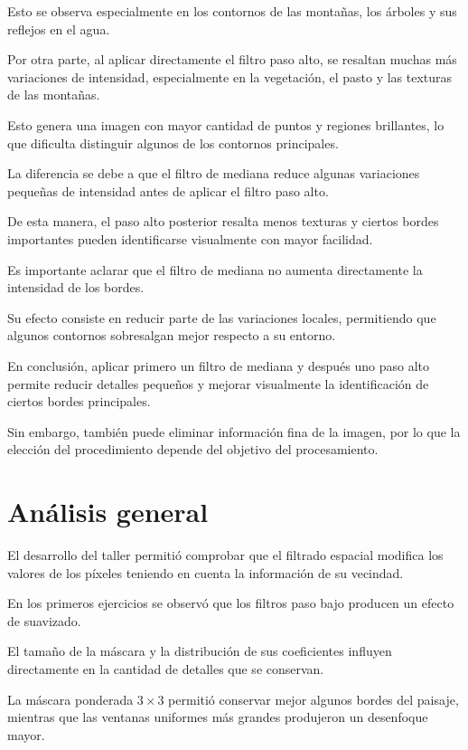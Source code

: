 \documentclass[11pt,letterpaper]{article}
\begin{document}
Esto se observa especialmente
en los contornos de las montañas,
los árboles y sus reflejos en el agua.

Por otra parte, al aplicar directamente
el filtro paso alto, se resaltan
muchas más variaciones de intensidad,
especialmente en la vegetación,
el pasto y las texturas de las montañas.

Esto genera una imagen con mayor
cantidad de puntos y regiones brillantes,
lo que dificulta distinguir algunos
de los contornos principales.

La diferencia se debe a que el filtro
de mediana reduce algunas variaciones
pequeñas de intensidad antes de aplicar
el filtro paso alto.

De esta manera, el paso alto posterior
resalta menos texturas y ciertos bordes
importantes pueden identificarse
visualmente con mayor facilidad.

Es importante aclarar que el filtro
de mediana no aumenta directamente
la intensidad de los bordes.

Su efecto consiste en reducir
parte de las variaciones locales,
permitiendo que algunos contornos
sobresalgan mejor respecto a su entorno.

En conclusión, aplicar primero
un filtro de mediana y después
uno paso alto permite reducir
detalles pequeños y mejorar visualmente
la identificación de ciertos bordes
principales.

Sin embargo, también puede eliminar
información fina de la imagen,
por lo que la elección del procedimiento
depende del objetivo del procesamiento.

\section{Análisis general}

El desarrollo del taller permitió comprobar
que el filtrado espacial modifica
los valores de los píxeles teniendo
en cuenta la información de su vecindad.

En los primeros ejercicios se observó
que los filtros paso bajo producen
un efecto de suavizado.

El tamaño de la máscara y la distribución
de sus coeficientes influyen directamente
en la cantidad de detalles que se conservan.

La máscara ponderada $3\times3$ permitió
conservar mejor algunos bordes del paisaje,
mientras que las ventanas uniformes
más grandes produjeron un desenfoque mayor.
\end{document}
